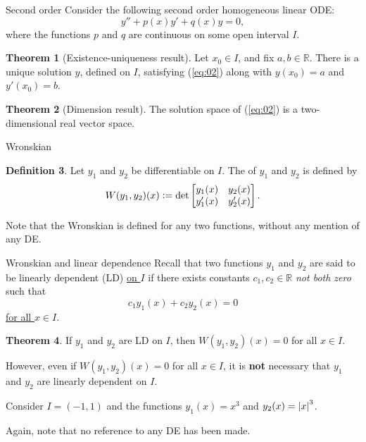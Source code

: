\documentclass[dvipsnames, handout]{beamer}
\theoremstyle{definition}
\newtheorem{thm}{Theorem}
\newtheorem{defn}[thm]{Definition}
\begin{document}
\begin{frame}{Second order}
  Consider the following second order homogeneous linear ODE:
  \begin{equation} \label{eq:02}
    y'' + p(x) y' + q(x) y = 0,
  \end{equation}
  where the functions $p$ and $q$ are continuous on some open interval $I$. \pause

  \begin{thm}[Existence-uniqueness result]
    Let $x_{0} \in I$, and fix $a, b \in \mathbb{R}$. \pause There is a unique solution $y$, defined on $I$, satisfying (\ref{eq:02}) along with $y(x_{0}) = a$ and $y'(x_{0}) = b$.
  \end{thm} \pause

  \begin{thm}[Dimension result]
    The solution space of (\ref{eq:02}) is a two-dimensional real vector space.
  \end{thm}
\end{frame}
\begin{frame}{Wronskian}
  \begin{defn}
    Let $y_{1}$ and $y_{2}$ be differentiable on $I$. \pause The  of $y_{1}$ and $y_{2}$ is defined by \pause
    \begin{equation*} 
      W(y_{1}, y_{2})(x) \vcentcolon= \det 
      \begin{bmatrix}
        y_{1}(x) & y_{2}(x) \\
        y_{1}'(x) & y_{2}'(x)
      \end{bmatrix}.
    \end{equation*}
  \end{defn} \pause

  Note that the Wronskian is defined for any two functions, without any mention of any DE.
\end{frame}
\begin{frame}{Wronskian and linear dependence}
  Recall that two functions $y_{1}$ and $y_{2}$ are said to be linearly dependent (LD) \underline{on $I$} \pause if there exists constants $c_{1}, c_{2} \in \mathbb{R}$ \emph{not both zero} such that \pause
  \begin{equation*} 
    c_{1} y_{1}(x) + c_{2} y_{2}(x) = 0
  \end{equation*} \pause
  \underline{for all $x \in I$}. \pause 

  \begin{thm}
    If $y_{1}$ and $y_{2}$ are LD on $I$, then $W(y_{1}, y_{2})(x) = 0$ for all $x \in I$.
  \end{thm} \pause

  However, even if $W(y_{1}, y_{2})(x) = 0$ for all $x \in I$, it is \textbf{not} necessary that $y_{1}$ and $y_{2}$ are linearly dependent on $I$. \pause

  Consider $I = (-1, 1)$ and the functions $y_{1}(x) = x^{3}$ and $y_{2}(x) = {\left\lvert x \right\lvert}^{3}$. \pause

  Again, note that no reference to any DE has been made.
\end{frame}
\end{document}
